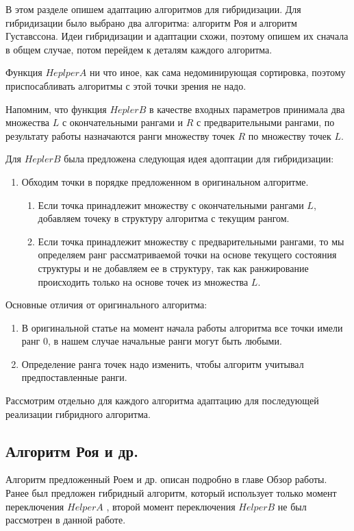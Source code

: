 В этом разделе опишем адаптацию алгоритмов для гибридизации. Для гибридизации было выбрано два алгоритма: алгоритм Роя и алгоритм Густавссона. Идеи гибридизации и адаптации схожи, поэтому опишем их сначала в общем случае, потом перейдем к деталям каждого алгоритма. 

Функция $HeplperA$ ни что иное, как сама недоминирующая сортировка, поэтому приспосабливать алгоритмы с этой точки зрения не надо.

Напомним, что функция $HeplerB$ в качестве входных параметров принимала два множества $L$ с окончательными рангами и $R$ с предварительными рангами, по результату работы назначаются ранги множеству точек $R$ по множеству точек $L$. 

Для $HeplerB$ была предложена следующая идея адоптации для гибридизации: 
\begin{enumerate}
  \item Обходим точки в порядке предложенном в оригинальном алгоритме.
  \begin{enumerate}
      \item Если точка принадлежит множеству с окончательными рангами $L$, добавляем точеку в структуру алгоритма с текущим рангом.
      \item Если точка принадлежит множеству с предварительными рангами, то мы определяем ранг рассматриваемой точки на основе текущего состояния структуры и не добавляем ее в структуру, так как ранжирование происходить только на основе точек из множества $L$.
  \end{enumerate}
\end{enumerate}


Основные отличия от оригинального алгоритма: 
\begin{enumerate}
    \item В оригинальной статье на момент начала работы алгоритма все точки имели ранг 0, в нашем случае начальные ранги могут быть любыми.
    \item Определение ранга точек надо изменить, чтобы алгоритм учитывал предпоставленные ранги.
\end{enumerate}

Рассмотрим отдельно для каждого алгоритма адаптацию для последующей реализации гибридного алгоритма.

\subsection{Алгоритм Роя и др.}

Алгоритм предложенный Роем и др. описан подробно в главе Обзор работы. Ранее был предложен гибридный алгоритм, который использует только момент переключения $HelperA$ \cite{Markina}, второй момент переключения $HelperB$ не был рассмотрен в данной работе. 

